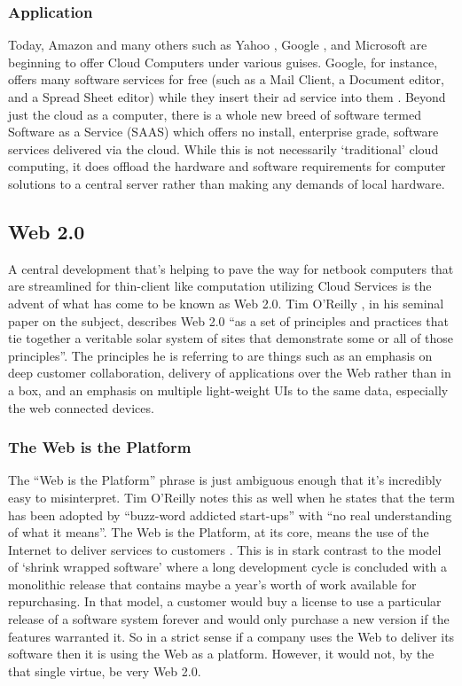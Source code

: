 \documentclass[12pt,oneside,letterpaper]{article}
\begin{document}
\subsubsection{Application}

Today, Amazon \citep{reiss2008} and many others such as Yahoo \citep{yahoo2009},
Google \citep{baker2007}, and Microsoft \citep{reiss2008} are beginning to offer
Cloud Computers under various guises.  Google, for instance, offers many
software services for free (such as a Mail Client, a Document editor, and a
Spread Sheet editor) while they insert their ad service into them
\citep{mcdougall2007}.  Beyond just the cloud as a computer, there is a whole
new breed of software termed Software as a Service (SAAS) which offers no
install, enterprise grade, software services delivered via the cloud.  While
this is not necessarily `traditional' cloud computing, it does offload the
hardware and software requirements for computer solutions to a central server
rather than making any demands of local hardware.

\subsection{Web 2.0}

A central development that's helping to pave the way for netbook computers that
are streamlined for thin-client like computation utilizing Cloud Services is the
advent of what has come to be known as Web 2.0.  Tim O'Reilly
\citeyearpar{oreilly2007}, in his seminal paper on the subject, describes Web
2.0 ``as a set of principles and practices that tie together a veritable solar
system of sites that demonstrate some or all of those principles''. The
principles he is referring to are things such as an emphasis on deep customer
collaboration, delivery of applications over the Web rather than in a box, and
an emphasis on multiple light-weight UIs to the same data, especially the web
connected devices.

\subsubsection{The Web is the Platform}

The ``Web is the Platform'' phrase is just ambiguous enough that it's incredibly
easy to misinterpret.  Tim O'Reilly \citeyearpar{oreilly2007} notes this as well when
he states that the term has been adopted by ``buzz-word addicted start-ups''
with ``no real understanding of what it means''.  The Web is the Platform, at
its core, means the use of the Internet to deliver services to customers
\citep{miller2005}.  This is in stark contrast to the model of `shrink wrapped
software' where a long development cycle is concluded with a monolithic release
that contains maybe a year's worth of work available for repurchasing.  In that
model, a customer would buy a license to use a particular release of a software
system forever and would only purchase a new version if the features warranted
it.  So in a strict sense if a company uses the Web to deliver its software then
it is using the Web as a platform.  However, it would not, by the that single
virtue, be very Web 2.0.
\end{document}
